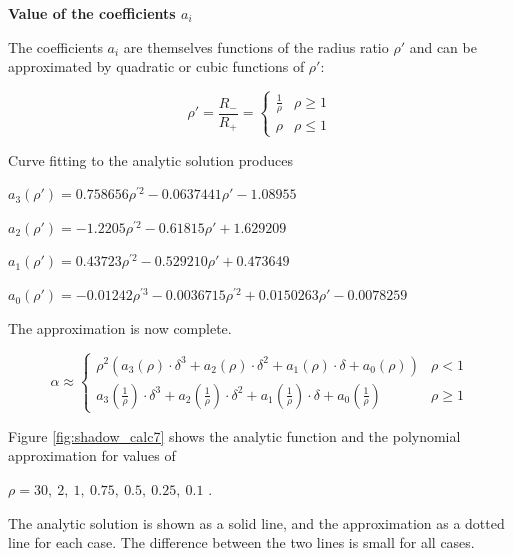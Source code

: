     \textbf{Value of the coefficients $a_i$}

    The coefficients  $a_{i}$ are themselves functions of the radius ratio
    $\rho'$ and can be approximated by quadratic or cubic functions of $\rho'$:

    \begin{equation*}
     \rho' = \frac{R_{-}}{R_{+}}=
      \begin{cases}
       \frac{1}{\rho} & \rho \geqslant 1 \\
       \rho & \rho \leqslant 1
      \end{cases}
    \end{equation*}

    Curve fitting to the analytic solution produces

    $a_{3}(\rho')=0.758656\rho^{'2}-0.0637441\rho' -1.08955$

    $a_{2}(\rho')=-1.2205\rho^{'2} -0.61815\rho' +1.629209$

    $a_{1}(\rho')=0.43723\rho^{'2}-0.529210\rho' +0.473649$

    $a_{0}(\rho')=-0.01242\rho^{'3}-0.0036715\rho^{'2}+0.0150263\rho'
    -0.0078259$

    The approximation is now complete.

    \begin{equation}
    \alpha \approx
    \begin{cases}
        \rho ^{2}\left(
        a_{3}(\rho )\cdot \delta ^{3}+
        a_{2}(\rho )\cdot \delta ^{2}+
        a_{1}(\rho )\cdot \delta +
        a_{0}(\rho )\right)     & \rho <1 \\
        a_{3}\left(\frac{1}{\rho }\right)\cdot \delta ^{3}+
        a_{2}\left(\frac{1}{\rho }\right)\cdot \delta ^{2}+
        a_{1}\left(\frac{1}{\rho }\right)\cdot \delta +
        a_{0}\left(\frac{1}{\rho }\right) & \rho \geqslant 1
    \end{cases}
    \end{equation}

    Figure \ref{fig:shadow_calc7} shows the analytic function and the
    polynomial approximation for values of

    $\rho =30,\ 2,\ 1,\ 0.75,\ 0.5,\ 0.25,\ 0.1$ .

    The analytic solution is shown as a solid line, and
    the approximation as a dotted line for each case.
    The difference between the two lines is small for all cases.


